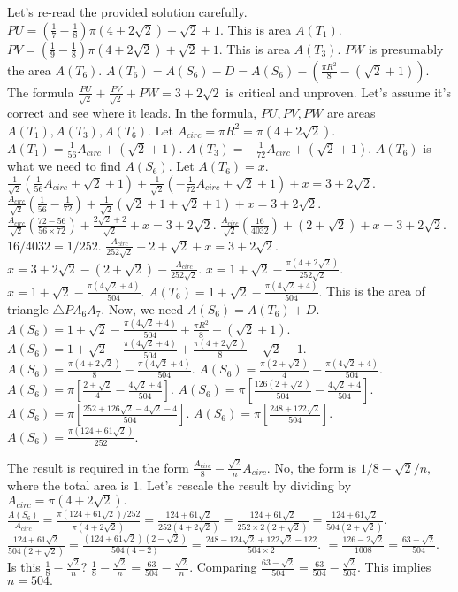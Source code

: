 Let's re-read the provided solution carefully. 
$PU = (\frac{1}{7}-\frac{1}{8}) \pi (4+ 2\sqrt{2}) + \sqrt{2}+1.$ This is area $A(T_1).$ 
$PV = (\frac{1}{9}-\frac{1}{8}) \pi (4+ 2\sqrt{2}) + \sqrt{2}+1.$ This is area $A(T_3).$ 
$PW$ is presumably the area $A(T_6).$ $A(T_6) = A(S_6) - D = A(S_6) - (\frac{\pi R^2}{8} - (\sqrt{2}+1)).$ 
The formula $\frac{PU}{\sqrt{2}} + \frac{PV}{\sqrt{2}} + PW = 3+2\sqrt2$ is critical and unproven. Let's assume it's correct and see where it leads. 
In the formula, $PU, PV, PW$ are areas $A(T_1), A(T_3), A(T_6).$ 
Let $A_{circ} = \pi R^2 = \pi(4+2\sqrt{2}).$ 
$A(T_1) = \frac{1}{56} A_{circ} + (\sqrt{2}+1).$ 
$A(T_3) = -\frac{1}{72} A_{circ} + (\sqrt{2}+1).$ 
$A(T_6)$ is what we need to find $A(S_6).$ Let $A(T_6)=x.$ 
$\frac{1}{\sqrt{2}} (\frac{1}{56} A_{circ} + \sqrt{2}+1) + \frac{1}{\sqrt{2}} (-\frac{1}{72} A_{circ} + \sqrt{2}+1) + x = 3+2\sqrt{2}.$ 
$\frac{A_{circ}}{\sqrt{2}} (\frac{1}{56} - \frac{1}{72}) + \frac{1}{\sqrt{2}}(\sqrt{2}+1 + \sqrt{2}+1) + x = 3+2\sqrt{2}.$ 
$\frac{A_{circ}}{\sqrt{2}} (\frac{72-56}{56 \times 72}) + \frac{2\sqrt{2}+2}{\sqrt{2}} + x = 3+2\sqrt{2}.$ 
$\frac{A_{circ}}{\sqrt{2}} (\frac{16}{4032}) + (2 + \sqrt{2}) + x = 3+2\sqrt{2}.$ 
$16/4032 = 1/252.$ 
$\frac{A_{circ}}{252\sqrt{2}} + 2 + \sqrt{2} + x = 3+2\sqrt{2}.$ 
$x = 3+2\sqrt{2} - (2+\sqrt{2}) - \frac{A_{circ}}{252\sqrt{2}}.$ 
$x = 1+\sqrt{2} - \frac{\pi(4+2\sqrt{2})}{252\sqrt{2}}.$ 
$x = 1+\sqrt{2} - \frac{\pi(4\sqrt{2}+4)}{504}.$ 
$A(T_6) = 1+\sqrt{2} - \frac{\pi(4\sqrt{2}+4)}{504}.$ 
This is the area of triangle $\triangle PA_6A_7.$ 
Now, we need $A(S_6) = A(T_6) + D.$ 
$A(S_6) = 1+\sqrt{2} - \frac{\pi(4\sqrt{2}+4)}{504} + \frac{\pi R^2}{8} - (\sqrt{2}+1).$ 
$A(S_6) = 1+\sqrt{2} - \frac{\pi(4\sqrt{2}+4)}{504} + \frac{\pi (4+2\sqrt{2})}{8} - \sqrt{2}-1.$ 
$A(S_6) = \frac{\pi(4+2\sqrt{2})}{8} - \frac{\pi(4\sqrt{2}+4)}{504}.$ 
$A(S_6) = \frac{\pi(2+\sqrt{2})}{4} - \frac{\pi(4\sqrt{2}+4)}{504}.$ 
$A(S_6) = \pi [ \frac{2+\sqrt{2}}{4} - \frac{4\sqrt{2}+4}{504} ].$ 
$A(S_6) = \pi [ \frac{126(2+\sqrt{2})}{504} - \frac{4\sqrt{2}+4}{504} ].$ 
$A(S_6) = \pi [ \frac{252 + 126\sqrt{2} - 4\sqrt{2} - 4}{504} ].$ 
$A(S_6) = \pi [ \frac{248 + 122\sqrt{2}}{504} ].$ 
$A(S_6) = \frac{\pi (124 + 61\sqrt{2})}{252}.$

The result is required in the form $\frac{A_{circ}}{8} - \frac{\sqrt{2}}{n} A_{circ}.$ No, the form is $1/8 - \sqrt{2}/n,$ where the total area is $1.$ 
Let's rescale the result by dividing by $A_{circ} = \pi(4+2\sqrt{2}).$ 
$\frac{A(S_6)}{A_{circ}} = \frac{\pi (124 + 61\sqrt{2})/252}{\pi(4+2\sqrt{2})} = \frac{124+61\sqrt{2}}{252(4+2\sqrt{2})} = \frac{124+61\sqrt{2}}{252 \times 2 (2+\sqrt{2})} = \frac{124+61\sqrt{2}}{504(2+\sqrt{2})}.$ 
$\frac{124+61\sqrt{2}}{504(2+\sqrt{2})} = \frac{(124+61\sqrt{2})(2-\sqrt{2})}{504(4-2)} = \frac{248 - 124\sqrt{2} + 122\sqrt{2} - 122}{504 \times 2}.$ 
$= \frac{126 - 2\sqrt{2}}{1008} = \frac{63 - \sqrt{2}}{504}.$ 
Is this $\frac{1}{8} - \frac{\sqrt{2}}{n}$? 
$\frac{1}{8} - \frac{\sqrt{2}}{n} = \frac{63}{504} - \frac{\sqrt{2}}{n}.$ 
Comparing $\frac{63 - \sqrt{2}}{504} = \frac{63}{504} - \frac{\sqrt{2}}{504}.$ 
This implies $n=504.$

